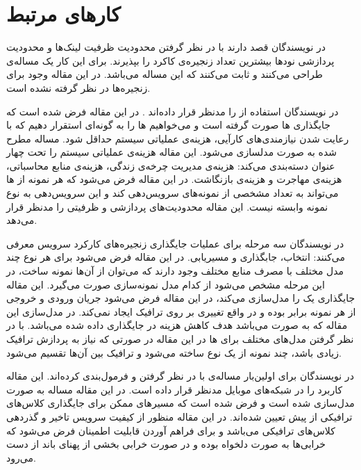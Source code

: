 \chapter{کارهای مرتبط}


در \cite{Eramo2016}
نویسندگان قصد دارند با در نظر گرفتن محدودیت ظرفیت لینک‌ها و محدودیت پردازشی نودها
بیشترین تعداد زنجیره‌ی کاکرد را بپذیرند. برای این کار یک مساله‌ی 
طراحی می‌کنند و ثابت می‌کنند که این مساله  می‌باشد.
در این مقاله وجود  برای زنجیره‌ها در نظر گرفته نشده است.

در \cite{AbuLebdeh2017}
نویسندگان استفاده از  را مدنظر قرار داده‌اند
. در این مقاله فرض شده است که جایگذاری ها صورت گرفته است
و می‌خواهیم ها را به گونه‌ای استقرار دهیم
که با رعایت شدن نیازمندی‌های کارآیی، هزینه‌ی عملیاتی سیستم حداقل شود.
مساله مطرح شده به صورت  مدلسازی می‌شود.
این مقاله هزینه‌ی عملیاتی سیستم را تحت چهار عنوان دسته‌بندی می‌کند:
هزینه‌ی مدیریت چرخه‌ی زندگی، هزینه‌ی منابع محاسباتی، هزینه‌ی مهاجرت و هزینه‌ی بازنگاشت.
در این مقاله فرض می‌شود که هر نمونه از ها می‌تواند به تعداد مشخصی از نمونه‌های 
سرویس‌دهی کند و این سرویس‌دهی به نوع نمونه وابسته نیست.
این مقاله محدودیت‌های پردازشی و ظرفیتی را مدنظر قرار می‌دهد.

در \cite{Ghaznavi2017}
نویسندگان سه مرحله برای عملیات جایگذاری زنجیره‌های کارکرد سرویس معرفی می‌کنند:
انتخاب،
جابگذاری و
مسیریابی.
در این مقاله فرض می‌شود برای هر نوع 
چند مدل مختلف با مصرف منابع مختلف وجود دارند که می‌توان از آن‌ها نمونه ساخت، در این مرحله مشخص می‌شود
از کدام مدل نمونه‌سازی صورت می‌گیرد.
این مقاله جایگذاری یک  را مدل‌سازی می‌کند،
در این مقاله فرض می‌شود جریان ورودی و خروجی از هر نمونه برابر بوده و در واقع
 تغییری بر روی ترافیک ایجاد نمی‌کند.
در مدل‌سازی این مقاله که به صورت  می‌باشد هدف کاهش هزینه در جایگذاری  داده شده می‌باشد.
با در نظر گرفتن مدل‌های مختلف برای ها در این مقاله
در صورتی که نیاز به پردازش ترافیک زیادی باشد، چند نمونه از یک نوع 
ساخته می‌شود و ترافیک بین آن‌ها تقسیم می‌شود.

در \cite{Yu2017}
نویسندگان برای اولین‌بار مساله‌ی 
با در نظر گرفتن  و 
فرمول‌بندی کرده‌اند.
این مقاله کاربرد  را در شبکه‌های موبایل مدنظر قرار داده است.
در این مقاله مساله به صورت 
مدل‌سازی شده است و فرض شده است که مسیرهای ممکن برای جایگذاری کلاس‌های ترافیکی از پیش تعیین شده‌اند.
در این مقاله منظور از کیفیت سرویس تاخیر و گذردهی کلاس‌های ترافیکی می‌باشد و 
برای فراهم آوردن قابلیت اطمینان فرض می‌شود که خرابی‌ها به صورت دلخواه بوده و در صورت خرابی‌
بخشی از پهنای باند از دست می‌رود.


